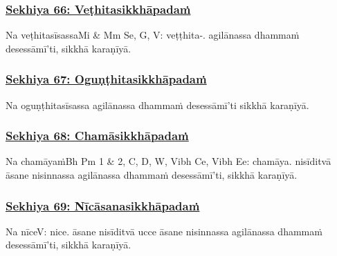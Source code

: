 \subsubsection*{\hyperref[training66]{Sekhiya 66: Veṭhitasikkhāpadaṁ}}
\label{sekh66}

Na veṭhitasīsassa\makeatletter\hyperlink{endnote-appendix}\makeatother Mi & Mm Se, G, V: veṭṭhita-. agilānassa dhammaṁ desessāmī'ti, sikkhā karaṇīyā.



\subsubsection*{\hyperref[training67]{Sekhiya 67: Oguṇṭhitasikkhāpadaṁ}}
\label{sekh67}

Na oguṇṭhitasīsassa agilānassa dhammaṁ desessāmī'ti sikkhā karaṇīyā.



\subsubsection*{\hyperref[training68]{Sekhiya 68: Chamāsikkhāpadaṁ}}
\label{sekh68}

Na chamāyaṁ\makeatletter\hyperlink{endnote-appendix}\makeatother Bh Pm 1 & 2, C, D, W, Vibh Ce, Vibh Ee: chamāya. nisīditvā āsane nisinnassa agilānassa dhammaṁ desessāmī'ti, sikkhā karaṇīyā.



\subsubsection*{\hyperref[training69]{Sekhiya 69: Nīcāsanasikkhāpadaṁ}}
\label{sekh69}

Na nīce\makeatletter\hyperlink{endnote-appendix}\makeatother V: nice. āsane nisīditvā ucce āsane nisinnassa agilānassa dhammaṁ desessāmī'ti, sikkhā karaṇīyā.



